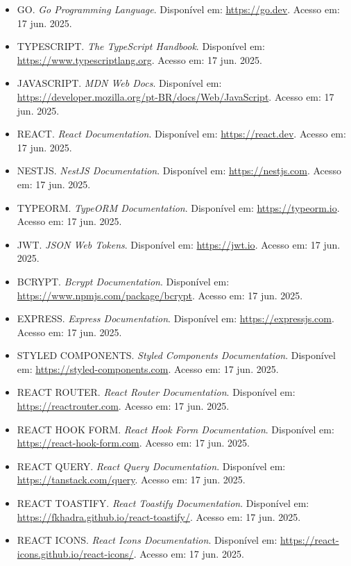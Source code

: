 \documentclass[12pt, a4paper]{article}
\begin{document}
\begin{spacing}{1.5}
\begin{itemize}
    \item GO. \textit{Go Programming Language}. Disponível em: \url{https://go.dev}. Acesso em: 17 jun. 2025.
    \item TYPESCRIPT. \textit{The TypeScript Handbook}. Disponível em: \url{https://www.typescriptlang.org}. Acesso em: 17 jun. 2025.
    \item JAVASCRIPT. \textit{MDN Web Docs}. Disponível em: \url{https://developer.mozilla.org/pt-BR/docs/Web/JavaScript}. Acesso em: 17 jun. 2025.
    \item REACT. \textit{React Documentation}. Disponível em: \url{https://react.dev}. Acesso em: 17 jun. 2025.
    \item NESTJS. \textit{NestJS Documentation}. Disponível em: \url{https://nestjs.com}. Acesso em: 17 jun. 2025.
    \item TYPEORM. \textit{TypeORM Documentation}. Disponível em: \url{https://typeorm.io}. Acesso em: 17 jun. 2025.
    \item JWT. \textit{JSON Web Tokens}. Disponível em: \url{https://jwt.io}. Acesso em: 17 jun. 2025.
    \item BCRYPT. \textit{Bcrypt Documentation}. Disponível em: \url{https://www.npmjs.com/package/bcrypt}. Acesso em: 17 jun. 2025.
    \item EXPRESS. \textit{Express Documentation}. Disponível em: \url{https://expressjs.com}. Acesso em: 17 jun. 2025.
    \item STYLED COMPONENTS. \textit{Styled Components Documentation}. Disponível em: \url{https://styled-components.com}. Acesso em: 17 jun. 2025.
    \item REACT ROUTER. \textit{React Router Documentation}. Disponível em: \url{https://reactrouter.com}. Acesso em: 17 jun. 2025.
    \item REACT HOOK FORM. \textit{React Hook Form Documentation}. Disponível em: \url{https://react-hook-form.com}. Acesso em: 17 jun. 2025.
    \item REACT QUERY. \textit{React Query Documentation}. Disponível em: \url{https://tanstack.com/query}. Acesso em: 17 jun. 2025.
    \item REACT TOASTIFY. \textit{React Toastify Documentation}. Disponível em: \url{https://fkhadra.github.io/react-toastify/}. Acesso em: 17 jun. 2025.
    \item REACT ICONS. \textit{React Icons Documentation}. Disponível em: \url{https://react-icons.github.io/react-icons/}. Acesso em: 17 jun. 2025.

\end{itemize}
\end{spacing}
\end{document}

